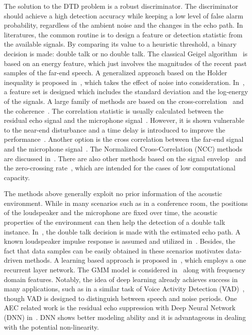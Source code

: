 \documentclass[a4paper]{article}
\begin{document}
The solution to the DTD problem is a robust discriminator. The discriminator should achieve a high detection accuracy while keeping a low level of false alarm probability, regardless of the ambient noise and the changes in the echo path. In literatures, the common routine is to design a feature or detection statistic from the available signals. By comparing its value to a heuristic threshold, a binary decision is made: double talk or no double talk. The classical Geigel algorithm~\cite{duttweiler1978twelve} is based on an energy feature, which just involves the magnitudes of the recent past samples of the far-end speech. A generalized approach based on the Holder inequality is proposed in~\cite{paleologu2011class}, which takes the effect of noise into consideration. In~\cite{hamidia2014double}, a feature set is designed which includes the standard deviation and the log-energy of the signals. A large family of methods are based on the cross-correlation~\cite{ye1991new,schuldt2012delay,cho1999objective,benesty2000new,iqbal2007normalized,gansler2006fast} and the coherence~\cite{gansler1996double,tashev2012coherence}. The correlation statistic is usually calculated between the residual echo signal and the microphone signal~\cite{ye1991new}. However, it is shown vulnerable to the near-end disturbance and a time delay is introduced to improve the performance~\cite{schuldt2012delay}. Another option is the cross correlation between the far-end signal and the microphone signal~\cite{cho1999objective}. The Normalized Cross-Correlation (NCC) methods are discussed in~\cite{benesty2000new,iqbal2007normalized}. There are also other methods based on the signal envelop~\cite{szwoch2008low} and the zero-crossing rate~\cite{ikram2015double}, which are intended for the cases of low computational capacity.

The methods above generally exploit no prior information of the acoustic environment. While in many scenarios such as in a conference room, the positions of the loudspeaker and the microphone are fixed over time, the acoustic properties of the environment can then help the detection of a double talk instance. In~\cite{jung2005new}, the double talk decision is made with the estimated echo path. A known loudspeaker impulse response is assumed and utilized in~\cite{ahgren2005acoustic}. Besides, the fact that data samples can be easily obtained in these scenarios motivates data-driven methods. A learning based approach is proposed in~\cite{iqbal2006doubletalk}, which employs a one recurrent layer network. The GMM model is considered in~\cite{lee2010frequency} along with frequency domain features. Notably, the idea of deep learning already achieves success in many applications, such as in a similar task of Voice Activity Detection (VAD)~\cite{zhang2013deep,wang2015universal}, though VAD is designed to distinguish between speech and noise periods. One AEC related work is the residual echo suppression with Deep Neural Network (DNN) in~\cite{lee2015dnn}. DNN shows better modeling ability and it is advantageous in dealing with the potential non-linearity.
\end{document}
